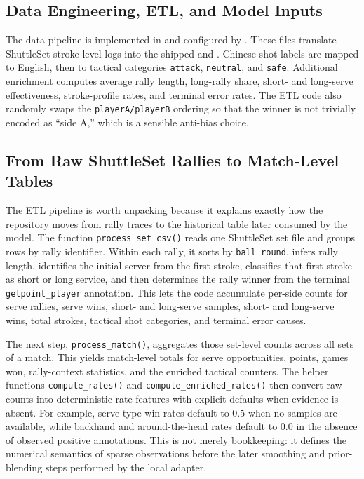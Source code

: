 \documentclass{article}
\begin{document}
\subsection*{Data Engineering, ETL, and Model Inputs}
The data pipeline is implemented in  and configured by . These files translate ShuttleSet stroke-level logs into the shipped  and . Chinese shot labels are mapped to English, then to tactical categories \texttt{attack}, \texttt{neutral}, and \texttt{safe}. Additional enrichment computes average rally length, long-rally share, short- and long-serve effectiveness, stroke-profile rates, and terminal error rates. The ETL code also randomly swaps the \texttt{playerA/playerB} ordering so that the winner is not trivially encoded as ``side A,'' which is a sensible anti-bias choice.

\subsection*{From Raw ShuttleSet Rallies to Match-Level Tables}
The ETL pipeline is worth unpacking because it explains exactly how the repository moves from rally traces to the historical table later consumed by the model. The function \texttt{process\_set\_csv()} reads one ShuttleSet set file and groups rows by rally identifier. Within each rally, it sorts by \texttt{ball\_round}, infers rally length, identifies the initial server from the first stroke, classifies that first stroke as short or long service, and then determines the rally winner from the terminal \texttt{getpoint\_player} annotation. This lets the code accumulate per-side counts for serve rallies, serve wins, short- and long-serve samples, short- and long-serve wins, total strokes, tactical shot categories, and terminal error causes.

The next step, \texttt{process\_match()}, aggregates those set-level counts across all sets of a match. This yields match-level totals for serve opportunities, points, games won, rally-context statistics, and the enriched tactical counters. The helper functions \texttt{compute\_rates()} and \texttt{compute\_enriched\_rates()} then convert raw counts into deterministic rate features with explicit defaults when evidence is absent. For example, serve-type win rates default to \(0.5\) when no samples are available, while backhand and around-the-head rates default to \(0.0\) in the absence of observed positive annotations. This is not merely bookkeeping: it defines the numerical semantics of sparse observations before the later smoothing and prior-blending steps performed by the local adapter.
\end{document}
